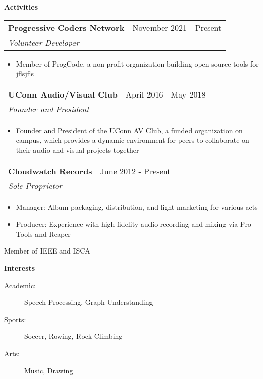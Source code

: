 \documentclass[letterpaper,11pt]{article}
\makeatletter
\newcommand{\resitem}[1]{\item #1 \vspace{-2pt}}
\newcommand{\resheading}[1]{{\large \colorbox{mygrey}{\begin{minipage}{\textwidth}{\textbf{#1 \vphantom{p\^{E}}}}\end{minipage}}}}
\newcommand{\ressubheading}[4]{
\begin{tabular*}{6.9in}{l@{\extracolsep{\fill}}r}
		\textbf{#1} & #2 \\
		\textit{#3} & \textit{#4} \\
\end{tabular*}\vspace{-6pt}}
\makeatother
\begin{document}
\resheading{Activities}
\begin{description}
\item
    \ressubheading{Progressive Coders Network}{November 2021 - Present}{Volunteer Developer}{}
    \begin{itemize}
        \resitem{Member of ProgCode, a non-profit organization building open-source tools for jflsjfls}
    \end{itemize}
\item
    \ressubheading{UConn Audio/Visual Club}{April 2016 - May 2018}{Founder and President}{}
    \begin{itemize}
        \resitem{Founder and President of the UConn AV Club, a funded organization on campus, which provides a dynamic environment for peers to collaborate on their audio and visual projects together}
    \end{itemize}
\item
    \ressubheading{Cloudwatch Records}{June 2012 - Present}{Sole Proprietor}{}
    \begin{itemize}
        \resitem{Manager: Album packaging, distribution, and light marketing for various acts}
        \resitem{Producer: Experience with high-fidelity audio recording and mixing via Pro Tools and Reaper}
    \end{itemize}
\item
    Member of IEEE and ISCA
\end{description}


\resheading{Interests}

\begin{description}
\item[Academic:] Speech Processing, Graph Understanding
\item[Sports:] Soccer, Rowing, Rock Climbing
\item[Arts:] Music, Drawing
\end{description}
\end{document}
